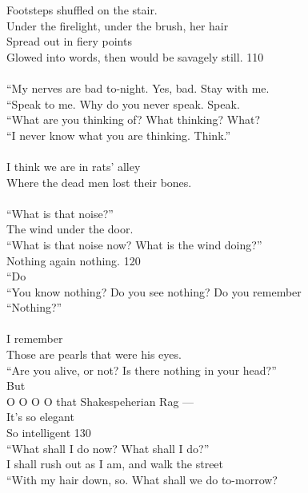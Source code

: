 \documentclass{article}
\begin{document}
Footsteps shuffled on the stair. \\
Under the firelight, under the brush, her hair \\
Spread out in fiery points \\
Glowed into words, then would be savagely still.                  \hfill 110 \\
 \\
``My nerves are bad to-night. Yes, bad. Stay with me. \\
``Speak to me. Why do you never speak. Speak. \\
``What are you thinking of? What thinking? What? \\
``I never know what you are thinking. Think.'' \\
 \\
I think we are in rats' alley \\
Where the dead men lost their bones. \\
 \\
``What is that noise?'' \\
\hspace*{2in}The wind under the door. \\
``What is that noise now? What is the wind doing?'' \\
\hspace*{2in}Nothing again nothing.               \hfill 120 \\
\hspace*{4in} ``Do \\
``You know nothing? Do you see nothing? Do you remember \\
``Nothing?'' \\
 \\
\indent   I remember \\
Those are pearls that were his eyes. \\
``Are you alive, or not? Is there nothing in your head?'' \\
\hspace*{4.1in} But \\
O O O O that Shakespeherian Rag --- \\
It's so elegant \\
So intelligent                                                    \hfill 130 \\
``What shall I do now? What shall I do?'' \\
I shall rush out as I am, and walk the street \\
``With my hair down, so. What shall we do to-morrow? \\
\end{document}
